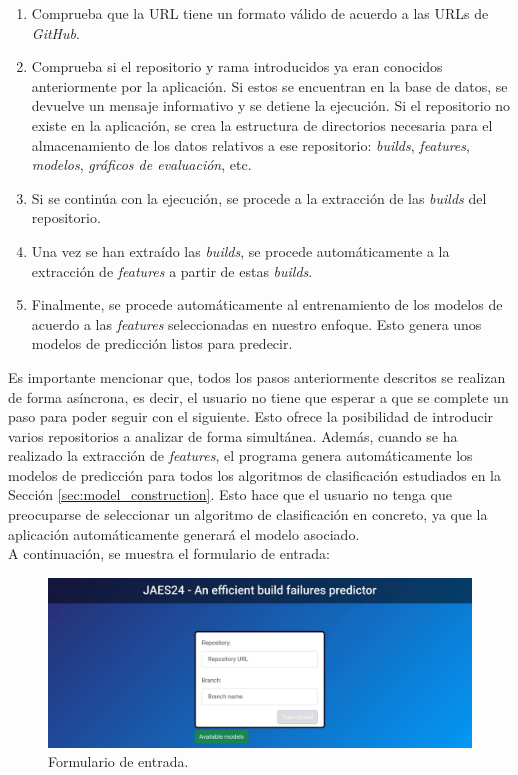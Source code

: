 \begin{enumerate}
    \item Comprueba que la URL tiene un formato válido de acuerdo a las URLs de \textit{GitHub}.\\
    \item Comprueba si el repositorio y rama introducidos ya eran conocidos anteriormente por la
    aplicación. Si estos se encuentran en la base de datos, se devuelve un mensaje informativo y
    se detiene la ejecución. Si el repositorio no existe en la aplicación, se crea la estructura
    de directorios necesaria para el almacenamiento de los datos relativos a ese repositorio:
    \textit{builds}, \textit{features}, \textit{modelos}, \textit{gráficos de evaluación}, etc.\\
    \item Si se continúa con la ejecución, se procede a la extracción de las \textit{builds} del 
    repositorio.\\
    \item Una vez se han extraído las \textit{builds}, se procede automáticamente a la extracción
    de \textit{features} a partir de estas \textit{builds}.\\
    \item Finalmente, se procede automáticamente al entrenamiento de los modelos de acuerdo a las
    \textit{features} seleccionadas en nuestro enfoque. Esto genera unos modelos de predicción
    listos para predecir.\\
\end{enumerate}

Es importante mencionar que, todos los pasos anteriormente descritos se realizan de forma
asíncrona, es decir, el usuario no tiene que esperar a que se complete un paso para poder seguir
con el siguiente. Esto ofrece la posibilidad de introducir varios repositorios a analizar de
forma simultánea. Además, cuando se ha realizado la extracción de \textit{features}, el programa
genera automáticamente los modelos de predicción para todos los algoritmos de clasificación
estudiados en la Sección \ref{sec:model_construction}. Esto hace que el usuario no tenga que
preocuparse de seleccionar un algoritmo de clasificación en concreto, ya que la aplicación
automáticamente generará el modelo asociado.\\

\noindent A continuación, se muestra el formulario de entrada:

\begin{figure}[H]
    \centering
    \includegraphics[scale=0.3]{images/input-form.pdf}
    \caption{Formulario de entrada.}
    \label{fig:input_form}
\end{figure}

